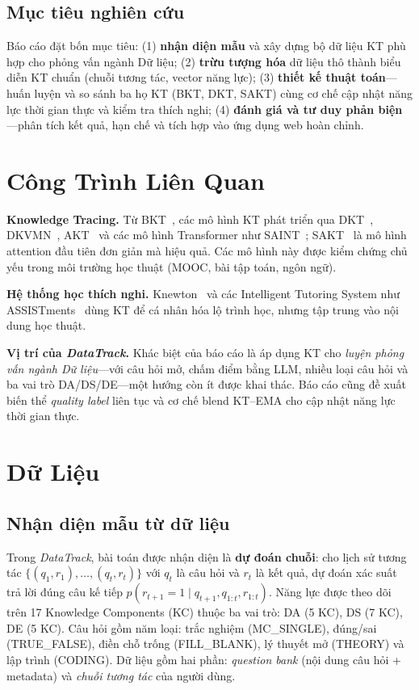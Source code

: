 \documentclass[11pt]{article}
\newcommand{\sys}{\textit{DataTrack}}
\begin{document}
\subsection{Mục tiêu nghiên cứu}
Báo cáo đặt bốn mục tiêu: (1) \textbf{nhận diện mẫu} và xây dựng bộ dữ liệu KT phù hợp cho phỏng vấn ngành Dữ liệu; (2) \textbf{trừu tượng hóa} dữ liệu thô thành biểu diễn KT chuẩn (chuỗi tương tác, vector năng lực); (3) \textbf{thiết kế thuật toán}---huấn luyện và so sánh ba họ KT (BKT, DKT, SAKT) cùng cơ chế cập nhật năng lực thời gian thực và kiểm tra thích nghi; (4) \textbf{đánh giá và tư duy phản biện}---phân tích kết quả, hạn chế và tích hợp vào ứng dụng web hoàn chỉnh.

\section{Công Trình Liên Quan}
\textbf{Knowledge Tracing.} Từ BKT~\cite{corbett1994knowledge}, các mô hình KT phát triển qua DKT~\cite{piech2015deep}, DKVMN~\cite{zhang2017dynamic}, AKT~\cite{ghosh2020context} và các mô hình Transformer như SAINT~\cite{choi2020towards}; SAKT~\cite{pandey2019self} là mô hình attention đầu tiên đơn giản mà hiệu quả. Các mô hình này được kiểm chứng chủ yếu trong môi trường học thuật (MOOC, bài tập toán, ngôn ngữ).

\textbf{Hệ thống học thích nghi.} Knewton~\cite{ferreira2017knewton} và các Intelligent Tutoring System như ASSISTments~\cite{heffernan2014assistments} dùng KT để cá nhân hóa lộ trình học, nhưng tập trung vào nội dung học thuật.

\textbf{Vị trí của \sys{}.} Khác biệt của báo cáo là áp dụng KT cho \textit{luyện phỏng vấn ngành Dữ liệu}---với câu hỏi mở, chấm điểm bằng LLM, nhiều loại câu hỏi và ba vai trò DA/DS/DE---một hướng còn ít được khai thác. Báo cáo cũng đề xuất biến thể \textit{quality label} liên tục và cơ chế blend KT--EMA cho cập nhật năng lực thời gian thực.

\section{Dữ Liệu}

\subsection{Nhận diện mẫu từ dữ liệu}
Trong \sys{}, bài toán được nhận diện là \textbf{dự đoán chuỗi}: cho lịch sử tương tác $\{(q_1,r_1),\ldots,(q_t,r_t)\}$ với $q_t$ là câu hỏi và $r_t$ là kết quả, dự đoán xác suất trả lời đúng câu kế tiếp $p(r_{t+1}=1\mid q_{t+1}, q_{1:t}, r_{1:t})$. Năng lực được theo dõi trên 17 Knowledge Components (KC) thuộc ba vai trò: DA (5 KC), DS (7 KC), DE (5 KC). Câu hỏi gồm năm loại: trắc nghiệm (MC\_SINGLE), đúng/sai (TRUE\_FALSE), điền chỗ trống (FILL\_BLANK), lý thuyết mở (THEORY) và lập trình (CODING). Dữ liệu gồm hai phần: \textit{question bank} (nội dung câu hỏi + metadata) và \textit{chuỗi tương tác} của người dùng.
\end{document}
